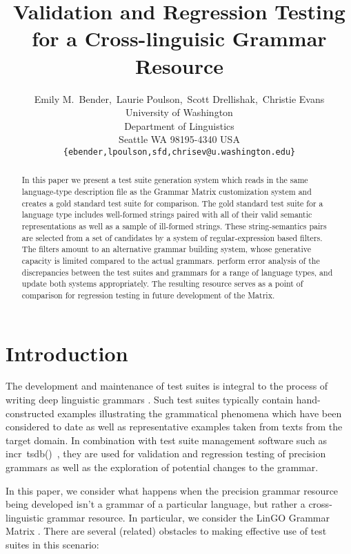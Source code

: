 \documentclass[11pt]{article}
\title{Validation and Regression Testing for a Cross-linguisic Grammar Resource}
\author{Emily M.~Bender,\  Laurie Poulson,\  Scott Drellishak,\ Christie Evans\\
  University of Washington\\
  Department of Linguistics\\
  Seattle WA 98195-4340 USA\\
  {\tt \{ebender,lpoulson,sfd,chrisev@u.washington.edu\}}}
\date{}
\newcommand{\itsdb}{\mbox{\sf \lbrack incr tsdb()\rbrack}}
\begin{document}
\maketitle
\begin{abstract}
  In this paper we present a test suite generation system which reads
  in the same language-type description file as the Grammar Matrix
  customization system and creates a gold standard test suite for
  comparison.  The gold standard test suite for a language type
  includes well-formed strings paired with all of their valid semantic
  representations as well as a sample of ill-formed strings.
  These string-semantics pairs are selected from a set
  of candidates by a system of regular-expression based filters.  The
  filters amount to an alternative grammar building system, whose
  generative capacity is limited compared to the actual grammars.  
  perform error analysis of the discrepancies between the test suites
  and grammars for a range of language types, and update both systems
  appropriately.  The resulting resource serves as a point of
  comparison for regression testing in future development of the
  Matrix.
\end{abstract}


\section{Introduction}

The development and maintenance of test suites is integral to the
process of writing deep linguistic grammars
\cite{Oep:Fli:98,But:Kin:03}.  Such test suites typically contain
hand-constructed examples illustrating the grammatical phenomena which
have been considered to date as well as representative examples taken
from texts from the target domain.  In combination with test suite
management software such as \itsdb\ \cite{Oepen:01}, they are used for
validation and regression testing of precision grammars as well as the
exploration of potential changes to the grammar.  

In this paper, we consider what happens when the precision grammar
resource being developed isn't a grammar of a particular language, but
rather a cross-linguistic grammar resource.  In particular, we
consider the LinGO Grammar Matrix
\cite{Ben:Fli:Oep:02,Ben:Fli:05,Dre:Ben:05}.  There are several
(related) obstacles to making effective use of test suites in this
scenario:
\end{document}
